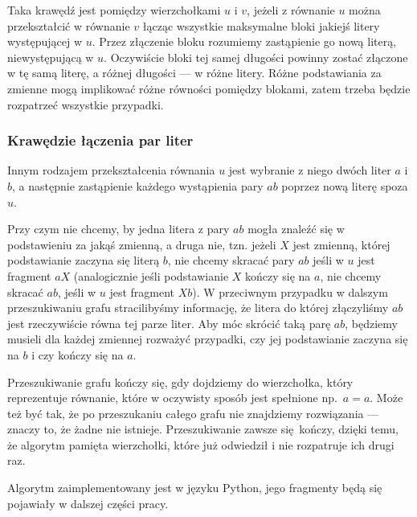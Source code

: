 \documentclass[leqno, 12pt]{article}
\begin{document}
Taka krawędź jest pomiędzy wierzchołkami $u$ i $v$, jeżeli z równanie $u$ można przekształcić w równanie $v$ łącząc wszystkie maksymalne bloki jakiejś litery występującej w $u$. Przez złączenie bloku rozumiemy zastąpienie go nową literą, niewystępującą w $u$. Oczywiście bloki tej samej długości powinny zostać złączone w tę samą literę, a różnej długości --- w różne litery.
Różne podstawiania za zmienne mogą implikować różne równości pomiędzy blokami, zatem trzeba będzie rozpatrzeć wszystkie przypadki.


\subsubsection*{Krawędzie łączenia par liter}
Innym rodzajem przekształcenia równania $u$ jest wybranie z niego dwóch liter $a$ i $b$, a następnie zastąpienie każdego wystąpienia pary $ab$ poprzez nową literę spoza $u$.


Przy czym nie chcemy, by jedna litera z pary $ab$ mogła znaleźć się w podstawieniu za jakąś zmienną, a druga nie, tzn. jeżeli $X$ jest zmienną, której podstawianie zaczyna się literą $b$, nie chcemy skracać pary $ab$ jeśli w $u$ jest fragment $aX$ (analogicznie jeśli podstawianie $X$ kończy się na $a$, nie chcemy skracać $ab$, jeśli w $u$ jest fragment $Xb$). W przeciwnym przypadku w dalszym przeszukiwaniu grafu stracilibyśmy informację, że litera do której złączyliśmy $ab$ jest rzeczywiście równa tej parze liter. Aby móc skrócić taką parę $ab$, będziemy musieli dla każdej zmiennej rozważyć przypadki, czy jej podstawianie zaczyna się na $b$ i czy kończy się na $a$.


Przeszukiwanie grafu kończy się, gdy dojdziemy do wierzchołka, który reprezentuje równanie, które w oczywisty sposób jest spełnione np.\ $a=a$. Może też być tak, że po przeszukaniu całego grafu nie znajdziemy rozwiązania --- znaczy to, że żadne nie istnieje. Przeszukiwanie zawsze się kończy, dzięki temu, że algorytm pamięta wierzchołki, które już odwiedził i nie rozpatruje ich drugi raz.



Algorytm zaimplementowany jest w języku Python, jego fragmenty będą się pojawiały w dalszej części pracy.
\end{document}
